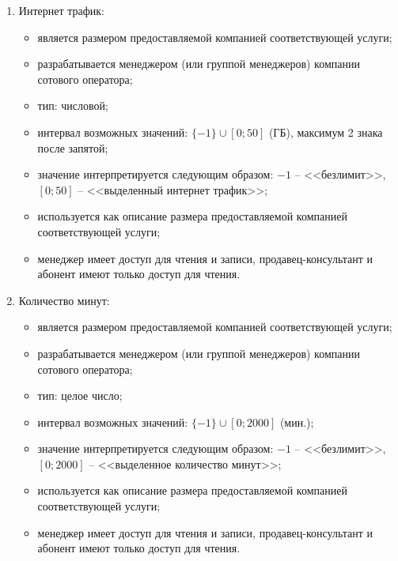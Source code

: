 \begin{enumerate}
\begin{enumerate}
        \item Интернет трафик:
        \begin{itemize}
            \item является размером предоставляемой компанией соответствующей услуги;
            \item разрабатывается менеджером (или группой менеджеров) компании сотового оператора;
            \item тип: числовой;
            \item интервал возможных значений: $\{-1\} \cup [0; 50]$ (ГБ), максимум 2 знака после запятой; %
            \item значение интерпретируется следующим образом: $-1$ -- <<безлимит>>, $[0; 50]$ -- <<выделенный интернет трафик>>;
            \item используется как описание размера предоставляемой компанией соответствующей услуги;
            \item менеджер имеет доступ для чтения и записи, продавец-консультант и абонент имеют только доступ для чтения.
        \end{itemize}

        \item Количество минут:
        \begin{itemize}
            \item является размером предоставляемой компанией соответствующей услуги;
            \item разрабатывается менеджером (или группой менеджеров) компании сотового оператора;
            \item тип: целое число;
            \item интервал возможных значений: $\{-1\} \cup [0; 2 000]$ (мин.); %
            \item значение интерпретируется следующим образом: $-1$ -- <<безлимит>>, $[0; 2 000]$ -- <<выделенное количество минут>>;
            \item используется как описание размера предоставляемой компанией соответствующей услуги;
            \item менеджер имеет доступ для чтения и записи, продавец-консультант и абонент имеют только доступ для чтения.
        \end{itemize}


\end{enumerate}
\end{enumerate}
